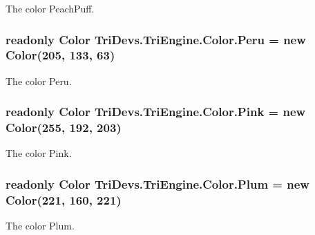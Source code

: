 The color Peach\-Puff. 

\hypertarget{struct_tri_devs_1_1_tri_engine_1_1_color_a4f396155a6163d435665b6d72870ed95}{
\subsubsection[{Peru}]{\setlength{\rightskip}{0pt plus 5cm}readonly {\bf Color} Tri\-Devs.\-Tri\-Engine.\-Color.\-Peru = new {\bf Color}(205, 133, 63)\hspace{0.3cm}{\ttfamily [static]}}}\label{struct_tri_devs_1_1_tri_engine_1_1_color_a4f396155a6163d435665b6d72870ed95}


The color Peru. 

\hypertarget{struct_tri_devs_1_1_tri_engine_1_1_color_af5c03ddcbc013bd5e09d20f8fcd62a71}{
\subsubsection[{Pink}]{\setlength{\rightskip}{0pt plus 5cm}readonly {\bf Color} Tri\-Devs.\-Tri\-Engine.\-Color.\-Pink = new {\bf Color}(255, 192, 203)\hspace{0.3cm}{\ttfamily [static]}}}\label{struct_tri_devs_1_1_tri_engine_1_1_color_af5c03ddcbc013bd5e09d20f8fcd62a71}


The color Pink. 

\hypertarget{struct_tri_devs_1_1_tri_engine_1_1_color_a9f0160e1a05f76c164f5243183f3bc4b}{
\subsubsection[{Plum}]{\setlength{\rightskip}{0pt plus 5cm}readonly {\bf Color} Tri\-Devs.\-Tri\-Engine.\-Color.\-Plum = new {\bf Color}(221, 160, 221)\hspace{0.3cm}{\ttfamily [static]}}}\label{struct_tri_devs_1_1_tri_engine_1_1_color_a9f0160e1a05f76c164f5243183f3bc4b}


The color Plum. 

